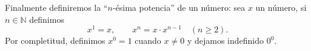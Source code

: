 \documentclass{beamer}
\begin{document}
 

\medspace 
 

\begin{frame}\frametitle{} 	




 Finalmente definiremos  la ``$n$-ésima potencia'' de un número: sea $x$ un  número, si $n \in \mathbb N $ definimos\pause 
 $$
 x^1=x,\qquad x^n= x \cdot x^{n-1} \quad (n\ge 2).
 $$\pause 
 Por completitud,  definimos $x^0=1$ cuando $x \ne 0$ y  dejamos indefinido $0^0$. 

\end{frame}
\end{document}
